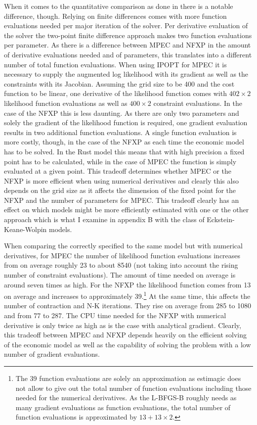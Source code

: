 When it comes to the quantitative comparison as done in \cite{Iskhakov.2016} there is a notable difference, though. Relying on finite differences comes with more function evaluations needed per major iteration of the solver. Per derivative evaluation of the solver the two-point finite difference approach makes two function evaluations per parameter. As there is a difference between MPEC and NFXP in the amount of derivative evaluations needed and of parameters, this translates into a different number of total function evaluations. When using IPOPT for MPEC it is necessary to supply the augmented log likelihood with its gradient as well as the constraints with its Jacobian. Assuming the grid size to be 400 and the cost function to be linear, one derivative of the likelihood function comes with $402 \times 2$ likelihood function evaluations as well as $400 \times 2$ constraint evaluations. In the case of the NFXP this is less daunting. As there are only two parameters and solely the gradient of the likelihood function is required, one gradient evaluation results in two additional function evaluations. A single function evaluation is more costly, though, in the case of the NFXP as each time the economic model has to be solved. In the Rust model this means that with high precision a fixed point has to be calculated, while in the case of MPEC the function is simply evaluated at a given point. This tradeoff determines whether MPEC or the NFXP is more efficient when using numerical derivatives and clearly this also depends on the grid size as it affects the dimension of the fixed point for the NFXP and the number of parameters for MPEC. This tradeoff clearly has an effect on which models might be more efficiently estimated with one or the other approach which is what I examine in appendix B with the class of Eckstein-Keane-Wolpin models.

When comparing the correctly specified to the same model but with numerical derivatives, for MPEC the number of likelihood function evaluations increases from on average roughly 23 to about 8540 (not taking into account the rising number of constraint evaluations). The amount of time needed on average is around seven times as high. For the NFXP the likelihood function comes from 13 on average and increases to approximately 39.\footnote{The 39 function evaluations are solely an approximation as estimagic does not allow to give out the total number of function evaluations including those needed for the numerical derivatives. As the L-BFGS-B roughly needs as many gradient evaluations as function evaluations, the total number of function evaluations is approximated by $13+13 \times 2$.} At the same time, this affects the number of contraction and N-K iterations. They rise on average from 285 to 1080 and from 77 to 287. The CPU time needed for the NFXP with numerical derivative is only twice as high as is the case with analytical gradient. Clearly, this tradeoff between MPEC and NFXP depends heavily on the efficient solving of the economic model as well as the capability of solving the problem with a low number of gradient evaluations.

